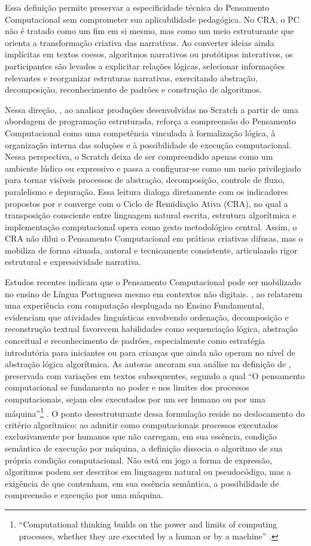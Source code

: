 \documentclass[portuguese]{textolivre}
\begin{document}
Essa definição permite preservar a especificidade técnica do Pensamento Computacional sem comprometer sua aplicabilidade pedagógica. No CRA, o PC não é tratado como um fim em si mesmo, mas como um meio estruturante que orienta a transformação criativa das narrativas. Ao converter ideias ainda implícitas em textos coesos, algoritmos narrativos ou protótipos interativos, os participantes são levados a explicitar relações lógicas, selecionar informações relevantes e reorganizar estruturas narrativas, exercitando abstração, decomposição, reconhecimento de padrões e construção de algoritmos.

Nessa direção, \textcite{kuz2023}, ao analisar produções desenvolvidas no Scratch a partir de uma abordagem de programação estruturada, reforça a compreensão do Pensamento Computacional como uma competência vinculada à formalização lógica, à organização interna das soluções e à possibilidade de execução computacional. Nessa perspectiva, o Scratch deixa de ser compreendido apenas como um ambiente lúdico ou expressivo e passa a configurar-se como um meio privilegiado para tornar visíveis processos de abstração, decomposição, controle de fluxo, paralelismo e depuração. Essa leitura dialoga diretamente com os indicadores propostos por \textcite{brennan2012} e converge com o Ciclo de Remidiação Ativa (CRA), no qual a transposição consciente entre linguagem natural escrita, estrutura algorítmica e implementação computacional opera como gesto metodológico central. Assim, o CRA não dilui o Pensamento Computacional em práticas criativas difusas, mas o mobiliza de forma situada, autoral e tecnicamente consistente, articulando rigor estrutural e expressividade narrativa.

Estudos recentes indicam que o Pensamento Computacional pode ser mobilizado no ensino de Língua Portuguesa mesmo em contextos não digitais. \textcite{sassi2023}, ao relatarem uma experiência com computação desplugada no Ensino Fundamental, evidenciam que atividades linguísticas envolvendo ordenação, decomposição e reconstrução textual favorecem habilidades como sequenciação lógica, abstração conceitual e reconhecimento de padrões, especialmente como estratégia introdutória para iniciantes ou para crianças que ainda não operam no nível de abstração lógica algorítmica. As autoras ancoram sua análise na definição de \textcite{wing2006}, preservada com variações em textos subsequentes, segundo a qual ``O pensamento computacional se fundamenta no poder e nos limites dos processos computacionais, sejam eles executados por um ser humano ou por uma máquina''\footnote{“Computational thinking builds on the power and limits of computing processes, whether they are executed by a human or by a machine” \cite[p.~33]{wing2006}.} \cite[p.~33]{wing2006}. O ponto desestruturante dessa formulação reside no deslocamento do critério algorítmico: ao admitir como computacionais processos executados exclusivamente por humanos que não carregam, em sua essência, condição semântica de execução por máquina, a definição dissocia o algoritmo de sua própria condição computacional. Não está em jogo a forma de expressão, algoritmos podem ser descritos em linguagem natural ou pseudocódigo, mas a exigência de que contenham, em sua essência semântica, a possibilidade de compreensão e execução por uma máquina.
\end{document}
